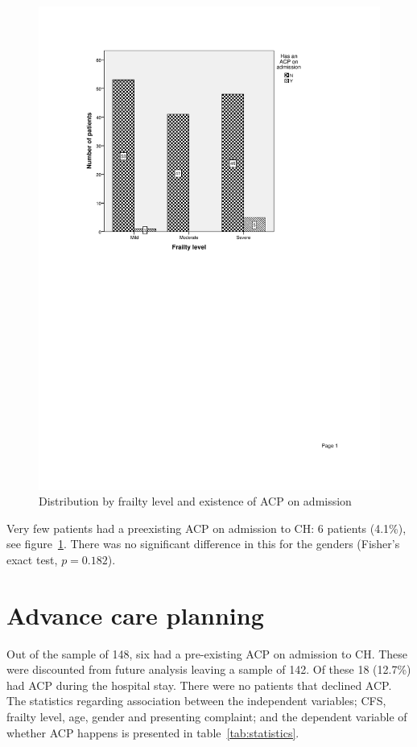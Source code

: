 \documentclass
[
	12pt,
	a4paper,
	oneside,
]{report}
\begin{document}
\begin{figure}[ht]
\centering
\caption{Distribution by frailty level and existence of ACP on admission}
\label{fig:chart-dist-frailty-level}
\includegraphics[width=\textwidth,
	trim={2.5cm 14cm 2.5cm 2.5cm},
	clip]{media/chart-dist-frailty-level}
\end{figure}

Very few patients had a preexisting ACP on admission to CH: 6
patients (4.1\%), see figure~\ref{fig:chart-dist-frailty-level}. There was no 
significant difference in this for the genders (Fisher's exact test, $p=0.182$).

\section{Advance care planning}

Out of the sample of 148, six had a pre-existing ACP on admission to CH. These 
were discounted from future analysis leaving a sample of 142. Of these 18 
(12.7\%) had ACP during the hospital stay. There were no patients that 
declined ACP. The statistics regarding association between the independent 
variables; CFS, frailty level, age, gender and presenting complaint; and the 
dependent variable of whether ACP happens is presented in 
table~\ref{tab:statistics}.
\end{document}
